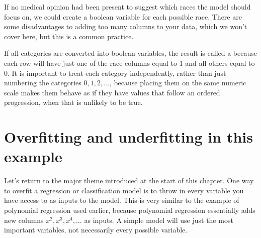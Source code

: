 \documentclass[letterpaper,10pt,english]{jupyterBook}
\begin{document}
\begin{sphinxVerbatim}[commandchars=\\\{\}]
    
\PYG{p}{[}\PYG{p}{]}  \PYG{p}{[}\PYG{p}{]}
\PYG{p}{[}\PYG{p}{]}  \PYG{p}{[}\PYG{p}{]}
\end{sphinxVerbatim}

\sphinxAtStartPar
If no medical opinion had been present to suggest which races the model should focus on, we could create a boolean variable for each possible race.  There are some disadvantages to adding too many columns to your data, which we won’t cover here, but this is a common practice.

\sphinxAtStartPar
If all categories are converted into boolean variables, the result is called a  because each row will have just one of the race columns equal to 1 and all others equal to 0.  It is important to treat each category independently, rather than just numbering the categories \(0,1,2,\ldots\), because placing them on the same numeric scale makes them behave as if they have values that follow an ordered progression, when that is unlikely to be true.


\section{Overfitting and underfitting in this example}
\label{\detokenize{chapter-17-machine-learning:overfitting-and-underfitting-in-this-example}}
\sphinxAtStartPar
Let’s return to the major theme introduced at the start of this chapter.  One way to overfit a regression or classification model is to throw in every variable you have access to as inputs to the model.  This is very similar to the example of polynomial regression used earlier, because polynomial regression essentially adds new columns \(x^2,x^3,x^4,\ldots\) as inputs.  A simple model will use just the most important variables, not necessarily every possible variable.
\end{document}

